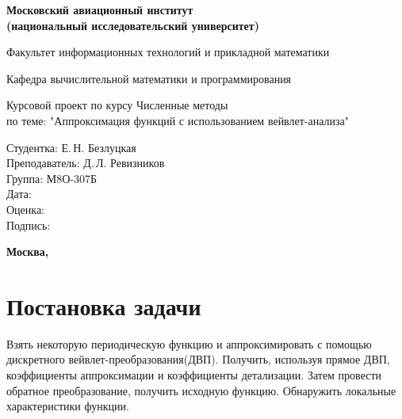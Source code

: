 \documentclass[12pt]{article}
\begin{document}
\begin{titlepage}
\begin{center}

\bfseries{\Large Московский авиационный институт\\ (национальный исследовательский университет)}

\vspace{48pt}


{\large Факультет информационных технологий и прикладной математики}

\vspace{36pt}


{\large Кафедра вычислительной математики и программирования}

\vspace{48pt}


\vspace{12pt}

Курсовой проект по курсу Численные методы\\
по теме: "Аппроксимация функций с использованием вейвлет-анализа"


\end{center}

\vspace{100pt}

\vfill

\begin{flushleft}
Студентка: Е.\,Н. Безлуцкая \\
Преподаватель: Д.\,Л. Ревизников \\
Группа: М8О-307Б\\
Дата:\\
Оценка:\\
Подпись:\\
\end{flushleft}

\vspace{12pt}


\begin{center}
\bfseries Москва, \the\year
\end{center}
\end{titlepage}

\pagebreak

\section*{Постановка задачи}

Взять некоторую периодическую функцию и аппроксимировать с помощью дискретного вейвлет-преобразования(ДВП). Получить, используя прямое ДВП, коэффициенты аппроксимации и коэффициенты детализации. Затем провести обратное преобразование, получить исходную функцию.
Обнаружить локальные характеристики функции.
\end{document}

